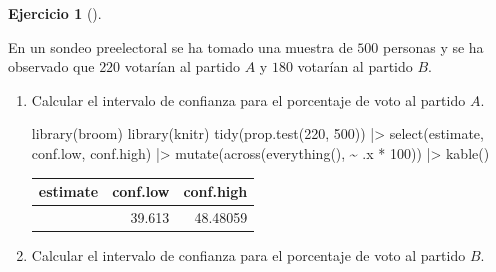 \documentclass[
  a4paper,
]{scrreport}
\newenvironment{Shaded}{\begin{snugshade}}{\end{snugshade}}
\newcommand{\DecValTok}[1]{\textcolor[rgb]{0.68,0.00,0.00}{#1}}
\newcommand{\FunctionTok}[1]{\textcolor[rgb]{0.28,0.35,0.67}{#1}}
\newcommand{\NormalTok}[1]{\textcolor[rgb]{0.00,0.23,0.31}{#1}}
\newcommand{\SpecialCharTok}[1]{\textcolor[rgb]{0.37,0.37,0.37}{#1}}
\theoremstyle{definition}
\newtheorem{exercise}{Ejercicio}[chapter]
\theoremstyle{remark}
\begin{document}
\begin{exercise}[]\protect\hypertarget{exr-intencion-voto}{}\label{exr-intencion-voto}

En un sondeo preelectoral se ha tomado una muestra de \(500\) personas y
se ha observado que \(220\) votarían al partido \(A\) y \(180\) votarían
al partido \(B\).

\begin{enumerate}
\def\labelenumi{\alph{enumi}.}
\item
  Calcular el intervalo de confianza para el porcentaje de voto al
  partido \(A\).

  \begin{tcolorbox}[enhanced jigsaw, coltitle=black, left=2mm, colback=white, leftrule=.75mm, toptitle=1mm, breakable, bottomrule=.15mm, titlerule=0mm, bottomtitle=1mm, title=\textcolor{quarto-callout-tip-color}{\faLightbulb}\hspace{0.5em}{Solución}, arc=.35mm, toprule=.15mm, rightrule=.15mm, colframe=quarto-callout-tip-color-frame, opacityback=0, colbacktitle=quarto-callout-tip-color!10!white, opacitybacktitle=0.6]

\begin{Shaded}
\begin{Highlighting}[]
\FunctionTok{library}\NormalTok{(broom)}
\FunctionTok{library}\NormalTok{(knitr)}
\FunctionTok{tidy}\NormalTok{(}\FunctionTok{prop.test}\NormalTok{(}\DecValTok{220}\NormalTok{, }\DecValTok{500}\NormalTok{)) }\SpecialCharTok{|\textgreater{}} 
\FunctionTok{select}\NormalTok{(estimate, conf.low, conf.high) }\SpecialCharTok{|\textgreater{}} 
\FunctionTok{mutate}\NormalTok{(}\FunctionTok{across}\NormalTok{(}\FunctionTok{everything}\NormalTok{(), }\SpecialCharTok{\textasciitilde{}}\NormalTok{ .x }\SpecialCharTok{*} \DecValTok{100}\NormalTok{)) }\SpecialCharTok{|\textgreater{}} 
\FunctionTok{kable}\NormalTok{()}
\end{Highlighting}
\end{Shaded}

  \begin{longtable}[]{@{}rrr@{}}
  \toprule\noalign{}
  estimate & conf.low & conf.high \\
  \midrule\noalign{}
  \endhead
  \bottomrule\noalign{}
  \endlastfoot
  44 & 39.613 & 48.48059 \\
  \end{longtable}

  \end{tcolorbox}
\item
  Calcular el intervalo de confianza para el porcentaje de voto al
  partido \(B\).


\end{enumerate}
\end{exercise}
\end{document}
